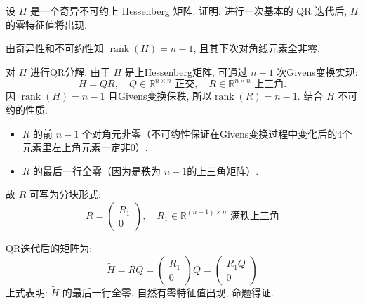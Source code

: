 \documentclass[12pt, answers]{exam}     %
\begin{document}
\begin{questions}
\question{}
设 \( H \) 是一个奇异不可约上 Hessenberg 矩阵. 证明: 进行一次基本的 QR 迭代后, \( H \) 的零特征值将出现. 

\begin{solution}由奇异性和不可约性知
\( \operatorname{rank}(H) = n-1\), 且其下次对角线元素全非零. 


对 \( H \) 进行QR分解. 由于 \( H \) 是上Hessenberg矩阵, 可通过 \( n-1 \) 次Givens变换实现: 
\[
H = QR, \quad Q \in \mathbb{R}^{n \times n} \text{ 正交}, \quad R \in \mathbb{R}^{n \times n} \text{ 上三角}. 
\]
因 \( \operatorname{rank}(H) = n-1 \) 且Givens变换保秩, 所以\( \operatorname{rank}(R) = n-1 \). 结合 \( H \) 不可约的性质: 
\begin{itemize}
    \item \( R \) 的前 \( n-1 \) 个对角元非零（不可约性保证在Givens变换过程中变化后的4个元素里左上角元素一定非0）. 
    \item \( R \) 的最后一行全零（因为是秩为 \( n-1 \)的上三角矩阵）. 
\end{itemize}
故 \( R \) 可写为分块形式: 
\[
R = \begin{pmatrix} R_1 \\ 0 \end{pmatrix}, \quad R_1 \in \mathbb{R}^{(n-1) \times n} \text{ 满秩上三角}
\]

QR迭代后的矩阵为: 
\[
\tilde{H} = RQ = \begin{pmatrix} R_1 \\ 0 \end{pmatrix} Q = \begin{pmatrix} R_1 Q \\ 0 \end{pmatrix}
\]
上式表明: \( \tilde{H} \) 的最后一行全零, 自然有零特征值出现, 命题得证. 

\end{solution}



\end{questions}
\end{document}
